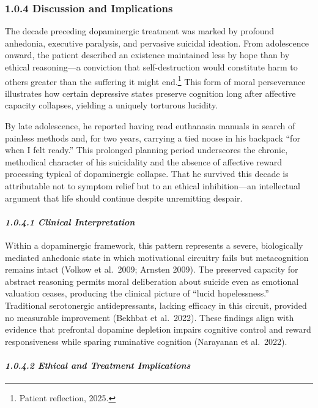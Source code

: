 \subsubsection{1.0.4 Discussion and Implications}\label{10b_traad-discussion-and-implications}

The decade preceding dopaminergic treatment was marked by profound anhedonia, executive paralysis, and pervasive suicidal ideation. From adolescence onward, the patient described an existence maintained less by hope than by ethical reasoning---a conviction that self-destruction would constitute harm to others greater than the suffering it might end.\footnote{Patient reflection, 2025.} This form of moral perseverance illustrates how certain depressive states preserve cognition long after affective capacity collapses, yielding a uniquely torturous lucidity.

By late adolescence, he reported having read euthanasia manuals in search of painless methods and, for two years, carrying a tied noose in his backpack ``for when I felt ready.'' This prolonged planning period underscores the chronic, methodical character of his suicidality and the absence of affective reward processing typical of dopaminergic collapse. That he survived this decade is attributable not to symptom relief but to an ethical inhibition---an intellectual argument that life should continue despite unremitting despair.

\paragraph{\texorpdfstring{\emph{1.0.4.1 Clinical Interpretation}}{1.0.4.1 Clinical Interpretation}}\label{10b_traad-clinical-interpretation}

Within a dopaminergic framework, this pattern represents a severe, biologically mediated anhedonic state in which motivational circuitry fails but metacognition remains intact (Volkow et al.~2009; Arnsten 2009). The preserved capacity for abstract reasoning permits moral deliberation about suicide even as emotional valuation ceases, producing the clinical picture of ``lucid hopelessness.'' Traditional serotonergic antidepressants, lacking efficacy in this circuit, provided no measurable improvement (Bekhbat et al.~2022). These findings align with evidence that prefrontal dopamine depletion impairs cognitive control and reward responsiveness while sparing ruminative cognition (Narayanan et al.~2022).

\paragraph{\texorpdfstring{\emph{1.0.4.2 Ethical and Treatment Implications}}{1.0.4.2 Ethical and Treatment Implications}}\label{10b_traad-ethical-and-treatment-implications}

